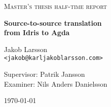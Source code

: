 \documentclass[parskip=half]{scrartcl}
\begin{document}
\begin{titlepage}

\centering
{\scshape\LARGE Master's thesis half-time report}


\vspace{0.5cm}
{\huge\bfseries Source-to-source translation\\ from Idris to Agda
  }

\vspace{2cm}
{\Large Jakob Larsson\\}
\texttt{<jakob@karljakoblarsson.com>}

\vspace{1.0cm}
{\large Supervisor: Patrik Jansson  \\
        Examiner: Nils Anders Danielsson}

\vspace{1.5cm}

\vfill
{\large \today}

\end{titlepage}

\tableofcontents
\newpage






\end{document}
